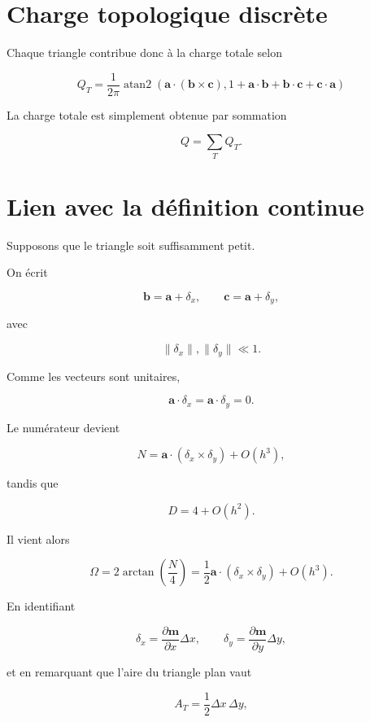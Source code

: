 \documentclass[11pt,a4paper]{article}
\begin{document}
\section{Charge topologique discrète}

Chaque triangle contribue donc à la charge totale selon

\begin{equation}
\boxed{
Q_T=
\frac{1}{2\pi}
\operatorname{atan2}
\left(
\mathbf{a}\cdot(\mathbf{b}\times\mathbf{c}),
1+\mathbf{a}\cdot\mathbf{b}
+\mathbf{b}\cdot\mathbf{c}
+\mathbf{c}\cdot\mathbf{a}
\right)
}
\end{equation}

La charge totale est simplement obtenue par sommation

\begin{equation}
Q=
\sum_T Q_T.
\end{equation}

\section{Lien avec la définition continue}

Supposons que le triangle soit suffisamment petit.

On écrit

\[
\mathbf{b}
=
\mathbf{a}+\delta_x,
\qquad
\mathbf{c}
=
\mathbf{a}+\delta_y,
\]

avec

\[
\|\delta_x\|,
\|\delta_y\|
\ll1.
\]

Comme les vecteurs sont unitaires,

\[
\mathbf{a}\cdot\delta_x
=
\mathbf{a}\cdot\delta_y
=
0.
\]

Le numérateur devient

\[
N
=
\mathbf{a}\cdot
(\delta_x\times\delta_y)
+O(h^3),
\]

tandis que

\[
D
=
4+O(h^2).
\]

Il vient alors

\[
\Omega
=
2\arctan\left(\frac{N}{4}\right)
=
\frac12
\mathbf{a}\cdot
(\delta_x\times\delta_y)
+O(h^3).
\]

En identifiant

\[
\delta_x
=
\frac{\partial\mathbf{m}}{\partial x}\Delta x,
\qquad
\delta_y
=
\frac{\partial\mathbf{m}}{\partial y}\Delta y,
\]

et en remarquant que l'aire du triangle plan vaut

\[
A_T
=
\frac12
\Delta x\,\Delta y,
\]
\end{document}
